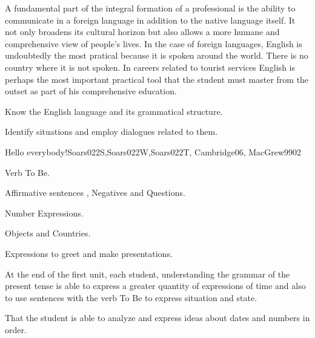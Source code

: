 \begin{syllabus}


\begin{justification}
A fundamental part of the integral formation of a professional is the ability to communicate in a foreign language in addition to the native language itself. 
It not only broadens its cultural horizon but also allows a more humane and comprehensive view of people's lives. In the case of foreign languages, English is undoubtedly the most pratical because it is spoken around the world. There is no country where it is not spoken. In careers related to tourist services English is perhaps the most important practical tool that the student must master from the outset as part of his comprehensive education.
\end{justification}

\begin{goals}
\item Know the English language and its grammatical structure.
\item Identify situations and employ dialogues related to them.
\end{goals}

\begin{competences}
    \item {}
\end{competences}

\begin{outcomes}
\item {}
\item {}
\end{outcomes}

\begin{unit}{}{Hello everybody!}{Soars022S,Soars022W,Soars022T, Cambridge06, MacGrew99}{0}{2}
   \begin{topics}
      \item Verb To Be.
      \item Affirmative sentences , Negatives and Questions.
      \item Number Expressions.
      \item Objects and Countries.
      \item Expressions to greet and make presentations.
   \end{topics}

   \begin{learningoutcomes}
      \item At the end of the first unit, each student, understanding
            the grammar of the present tense is able to express a greater quantity of expressions of time and also to use sentences with the verb To Be to express situation and state.
      \item That the student is able to analyze and express ideas about dates and numbers in order. 
   \end{learningoutcomes}
\end{unit}


\end{syllabus}

